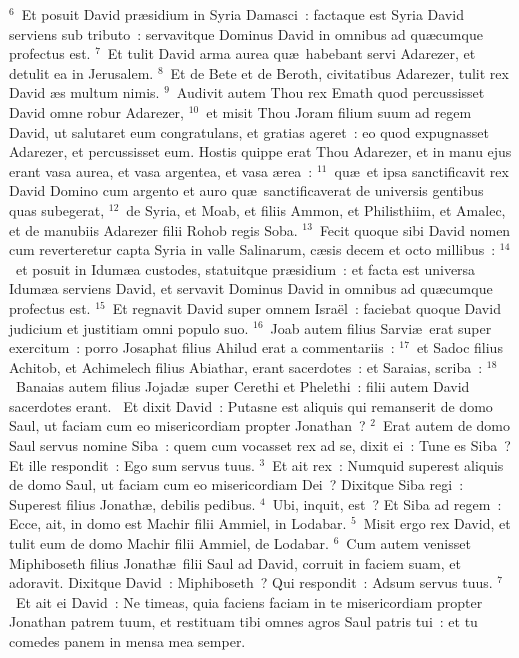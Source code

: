 ${}^{6}$~Et posuit David pr\ae sidium in Syria Damasci~: factaque est Syria David serviens sub tributo~: servavitque Dominus David in omnibus ad qu\ae cumque profectus est.
${}^{7}$~Et tulit David arma aurea qu\ae\ habebant servi Adarezer, et detulit ea in Jerusalem.
${}^{8}$~Et de Bete et de Beroth, civitatibus Adarezer, tulit rex David \ae s multum nimis.
${}^{9}$~Audivit autem Thou rex Emath quod percussisset David omne robur Adarezer,
${}^{10}$~et misit Thou Joram filium suum ad regem David, ut salutaret eum congratulans, et gratias ageret~: eo quod expugnasset Adarezer, et percussisset eum. Hostis quippe erat Thou Adarezer, et in manu ejus erant vasa aurea, et vasa argentea, et vasa \ae rea~:
${}^{11}$~qu\ae\ et ipsa sanctificavit rex David Domino cum argento et auro qu\ae\ sanctificaverat de universis gentibus quas subegerat,
${}^{12}$~de Syria, et Moab, et filiis Ammon, et Philisthiim, et Amalec, et de manubiis Adarezer filii Rohob regis Soba.
${}^{13}$~Fecit quoque sibi David nomen cum reverteretur capta Syria in valle Salinarum, c\ae sis decem et octo millibus~:
${}^{14}$~et posuit in Idum\ae a custodes, statuitque pr\ae sidium~: et facta est universa Idum\ae a serviens David, et servavit Dominus David in omnibus ad qu\ae cumque profectus est.
${}^{15}$~Et regnavit David super omnem Isra\"el~: faciebat quoque David judicium et justitiam omni populo suo.
${}^{16}$~Joab autem filius Sarvi\ae\ erat super exercitum~: porro Josaphat filius Ahilud erat a commentariis~:
${}^{17}$~et Sadoc filius Achitob, et Achimelech filius Abiathar, erant sacerdotes~: et Saraias, scriba~:
${}^{18}$~Banaias autem filius Jojad\ae\ super Cerethi et Phelethi~: filii autem David sacerdotes erant.
~Et dixit David~: Putasne est aliquis qui remanserit de domo Saul, ut faciam cum eo misericordiam propter Jonathan~?
${}^{2}$~Erat autem de domo Saul servus nomine Siba~: quem cum vocasset rex ad se, dixit ei~: Tune es Siba~? Et ille respondit~: Ego sum servus tuus.
${}^{3}$~Et ait rex~: Numquid superest aliquis de domo Saul, ut faciam cum eo misericordiam Dei~? Dixitque Siba regi~: Superest filius Jonath\ae , debilis pedibus.
${}^{4}$~Ubi, inquit, est~? Et Siba ad regem~: Ecce, ait, in domo est Machir filii Ammiel, in Lodabar.
${}^{5}$~Misit ergo rex David, et tulit eum de domo Machir filii Ammiel, de Lodabar.
${}^{6}$~Cum autem venisset Miphiboseth filius Jonath\ae\ filii Saul ad David, corruit in faciem suam, et adoravit. Dixitque David~: Miphiboseth~? Qui respondit~: Adsum servus tuus.
${}^{7}$~Et ait ei David~: Ne timeas, quia faciens faciam in te misericordiam propter Jonathan patrem tuum, et restituam tibi omnes agros Saul patris tui~: et tu comedes panem in mensa mea semper.
